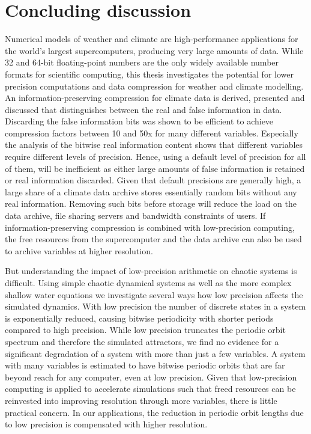\chapter{Concluding discussion}
\label{chap:conclusions}

Numerical models of weather and climate are high-performance applications for the world's largest supercomputers, producing very large amounts of data. 
While 32 and 64-bit floating-point numbers are the only widely available number formats for scientific computing, this thesis investigates the potential
for lower precision computations and data compression for weather and climate modelling. An information-preserving compression for climate data
is derived, presented and discussed that distinguishes between the real and false information in data. Discarding the false information bits was shown
to be efficient to achieve compression factors between 10 and 50x for many different variables. Especially the analysis of the bitwise real information content
shows that different variables require different levels of precision. Hence, using a default level of precision for all of them, will be inefficient as either large amounts of false information is retained or real information discarded. Given that default precisions are generally high, a large share of a climate data
archive stores essentially random bits without any real information. Removing such bits before storage will reduce the load on the data archive,
file sharing servers and bandwidth constraints of users. If information-preserving compression is combined with low-precision computing,
the free resources from the supercomputer and the data archive can also be used to archive variables at higher resolution.

But understanding the impact of low-precision arithmetic on chaotic systems is difficult. Using simple chaotic dynamical systems as well as the more
complex shallow water equations we investigate several ways how low precision affects the simulated dynamics. With low precision the number of
discrete states in a system is exponentially reduced, causing bitwise periodicity with shorter periods compared to high precision. While low precision
truncates the periodic orbit spectrum and therefore the simulated attractors, we find no evidence for a significant degradation of a system with more than
just a few variables. A system with many variables is estimated to have bitwise periodic orbits that are far beyond reach for any computer, even at low
precision. Given that low-precision computing is applied to accelerate simulations such that freed resources can be reinvested into improving resolution
through more variables, there is little practical concern. In our applications, the reduction in periodic orbit lengths due to low precision is compensated with
higher resolution. 

